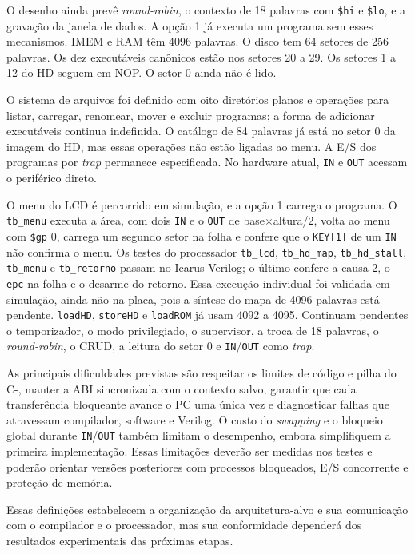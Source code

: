 \documentclass[
    12pt,
    openright,
    a4paper,
    english,
    brazilian
]{abntex2}
\begin{document}
O desenho ainda prevê \emph{round-robin}, o contexto de 18 palavras com \texttt{\$hi} e \texttt{\$lo}, e a gravação da janela de dados. A opção 1 já executa um programa sem esses mecanismos. IMEM e RAM têm 4096 palavras. O disco tem 64 setores de 256 palavras. Os dez executáveis canônicos estão nos setores 20 a 29. Os setores 1 a 12 do HD seguem em NOP. O setor 0 ainda não é lido.

O sistema de arquivos foi definido com oito diretórios planos e operações para listar, carregar, renomear, mover e excluir programas; a forma de adicionar executáveis continua indefinida. O catálogo de 84 palavras já está no setor 0 da imagem do HD, mas essas operações não estão ligadas ao menu. A E/S dos programas por \emph{trap} permanece especificada. No hardware atual, \texttt{IN} e \texttt{OUT} acessam o periférico direto.

O menu do LCD é percorrido em simulação, e a opção 1 carrega o programa. O \texttt{tb\_menu} executa a área, com dois \texttt{IN} e o \texttt{OUT} de base$\times$altura/2, volta ao menu com \texttt{\$gp} 0, carrega um segundo setor na folha e confere que o \texttt{KEY[1]} de um \texttt{IN} não confirma o menu. Os testes do processador \texttt{tb\_lcd}, \texttt{tb\_hd\_map}, \texttt{tb\_hd\_stall}, \texttt{tb\_menu} e \texttt{tb\_retorno} passam no Icarus Verilog; o último confere a causa 2, o \texttt{epc} na folha e o desarme do retorno. Essa execução individual foi validada em simulação, ainda não na placa, pois a síntese do mapa de 4096 palavras está pendente. \texttt{loadHD}, \texttt{storeHD} e \texttt{loadROM} já usam 4092 a 4095. Continuam pendentes o temporizador, o modo privilegiado, o supervisor, a troca de 18 palavras, o \emph{round-robin}, o CRUD, a leitura do setor 0 e \texttt{IN}/\texttt{OUT} como \emph{trap}.

As principais dificuldades previstas são respeitar os limites de código e pilha do C-, manter a ABI sincronizada com o contexto salvo, garantir que cada transferência bloqueante avance o PC uma única vez e diagnosticar falhas que atravessam compilador, software e Verilog. O custo do \emph{swapping} e o bloqueio global durante \texttt{IN}/\texttt{OUT} também limitam o desempenho, embora simplifiquem a primeira implementação. Essas limitações deverão ser medidas nos testes e poderão orientar versões posteriores com processos bloqueados, E/S concorrente e proteção de memória.

Essas definições estabelecem a organização da arquitetura-alvo e sua comunicação com o compilador e o processador, mas sua conformidade dependerá dos resultados experimentais das próximas etapas.

\postextual



\printindex
\end{document}
